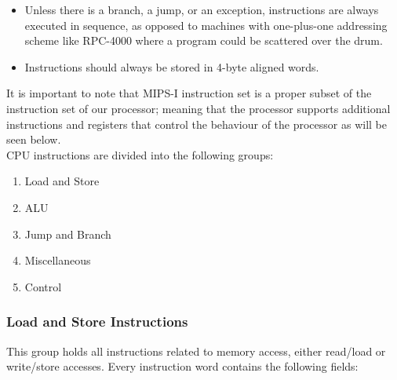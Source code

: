 \documentclass[oneside]{book}
\begin{document}
\begin{itemize}

\item Unless there is a branch, a jump, or an exception, instructions
      are always executed in sequence, as opposed to machines with
      one-plus-one addressing scheme like RPC-4000 where a program
      could be scattered over the drum.

\item Instructions should always be stored in 4-byte aligned words.

\end{itemize}

It is important to note that MIPS-I instruction set is a proper
subset of the instruction set of our processor; meaning that
the processor supports additional instructions and registers that
control the behaviour of the processor as will be seen below.\\

CPU instructions are divided into the following groups:

\begin{enumerate}

\item Load and Store
\item ALU
\item Jump and Branch
\item Miscellaneous
\item Control

\end{enumerate}

\subsubsection{Load and Store Instructions}

This group holds all instructions related to memory access, either
read/load or write/store accesses. Every instruction word contains
the following fields:
\end{document}
